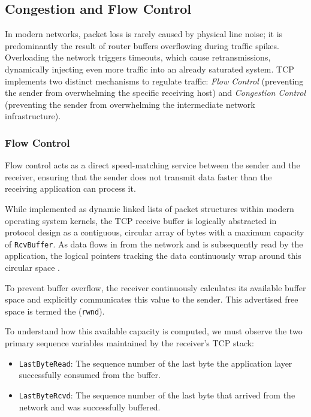 \subsection{Congestion and Flow Control}
In modern networks, packet loss is rarely caused by physical line noise; it is predominantly the result of router buffers overflowing during traffic spikes. Overloading the network triggers timeouts, which cause retransmissions, dynamically injecting even more traffic into an already saturated system. 
TCP implements two distinct mechanisms to regulate traffic: \emph{Flow Control} (preventing the sender from overwhelming the specific receiving host) and \emph{Congestion Control} (preventing the sender from overwhelming the intermediate network infrastructure).

\subsubsection{Flow Control}
Flow control acts as a direct speed-matching service between the sender and the receiver, ensuring that the sender does not transmit data faster than the receiving application can process it. 

While implemented as dynamic linked lists of packet structures within modern operating system kernels, the TCP receive buffer is logically abstracted in protocol design as a contiguous, circular array of bytes with a maximum capacity of \texttt{RcvBuffer}. As data flows in from the network and is subsequently read by the application, the logical pointers tracking the data continuously wrap around this circular space \cite{kurose2017}.

To prevent buffer overflow, the receiver continuously calculates its available buffer space and explicitly communicates this value to the sender. This advertised free space is termed the  (\texttt{rwnd}).

To understand how this available capacity is computed, we must observe the two primary sequence variables maintained by the receiver's TCP stack:
\begin{itemize}
    \item \texttt{LastByteRead}: The sequence number of the last byte the application layer successfully consumed from the buffer.
    \item \texttt{LastByteRcvd}: The sequence number of the last byte that arrived from the network and was successfully buffered.
\end{itemize}

